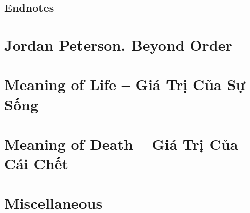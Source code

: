 \documentclass{article}
\begin{document}
\subsection{Endnotes}


\section{Jordan Peterson. Beyond Order}


\section{Meaning of Life -- Giá Trị Của Sự Sống}


\section{Meaning of Death -- Giá Trị Của Cái Chết}


\section{Miscellaneous}


\printbibliography[heading=bibintoc]
	
\end{document}
